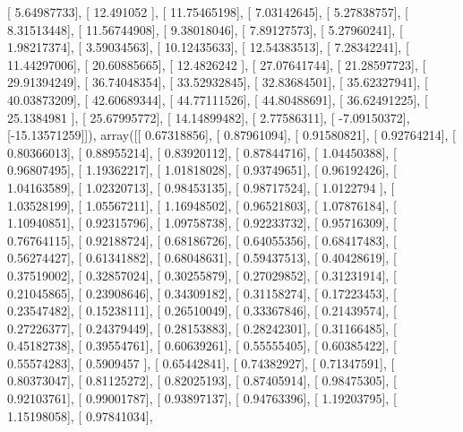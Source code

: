 \documentclass{article}
\begin{document}
       [  5.64987733],
       [ 12.491052  ],
       [ 11.75465198],
       [  7.03142645],
       [  5.27838757],
       [  8.31513448],
       [ 11.56744908],
       [  9.38018046],
       [  7.89127573],
       [  5.27960241],
       [  1.98217374],
       [  3.59034563],
       [ 10.12435633],
       [ 12.54383513],
       [  7.28342241],
       [ 11.44297006],
       [ 20.60885665],
       [ 12.4826242 ],
       [ 27.07641744],
       [ 21.28597723],
       [ 29.91394249],
       [ 36.74048354],
       [ 33.52932845],
       [ 32.83684501],
       [ 35.62327941],
       [ 40.03873209],
       [ 42.60689344],
       [ 44.77111526],
       [ 44.80488691],
       [ 36.62491225],
       [ 25.1384981 ],
       [ 25.67995772],
       [ 14.14899482],
       [  2.77586311],
       [ -7.09150372],
       [-15.13571259]]), array([[ 0.67318856],
       [ 0.87961094],
       [ 0.91580821],
       [ 0.92764214],
       [ 0.80366013],
       [ 0.88955214],
       [ 0.83920112],
       [ 0.87844716],
       [ 1.04450388],
       [ 0.96807495],
       [ 1.19362217],
       [ 1.01818028],
       [ 0.93749651],
       [ 0.96192426],
       [ 1.04163589],
       [ 1.02320713],
       [ 0.98453135],
       [ 0.98717524],
       [ 1.0122794 ],
       [ 1.03528199],
       [ 1.05567211],
       [ 1.16948502],
       [ 0.96521803],
       [ 1.07876184],
       [ 1.10940851],
       [ 0.92315796],
       [ 1.09758738],
       [ 0.92233732],
       [ 0.95716309],
       [ 0.76764115],
       [ 0.92188724],
       [ 0.68186726],
       [ 0.64055356],
       [ 0.68417483],
       [ 0.56274427],
       [ 0.61341882],
       [ 0.68048631],
       [ 0.59437513],
       [ 0.40428619],
       [ 0.37519002],
       [ 0.32857024],
       [ 0.30255879],
       [ 0.27029852],
       [ 0.31231914],
       [ 0.21045865],
       [ 0.23908646],
       [ 0.34309182],
       [ 0.31158274],
       [ 0.17223453],
       [ 0.23547482],
       [ 0.15238111],
       [ 0.26510049],
       [ 0.33367846],
       [ 0.21439574],
       [ 0.27226377],
       [ 0.24379449],
       [ 0.28153883],
       [ 0.28242301],
       [ 0.31166485],
       [ 0.45182738],
       [ 0.39554761],
       [ 0.60639261],
       [ 0.55555405],
       [ 0.60385422],
       [ 0.55574283],
       [ 0.5909457 ],
       [ 0.65442841],
       [ 0.74382927],
       [ 0.71347591],
       [ 0.80373047],
       [ 0.81125272],
       [ 0.82025193],
       [ 0.87405914],
       [ 0.98475305],
       [ 0.92103761],
       [ 0.99001787],
       [ 0.93897137],
       [ 0.94763396],
       [ 1.19203795],
       [ 1.15198058],
       [ 0.97841034],
\end{document}
